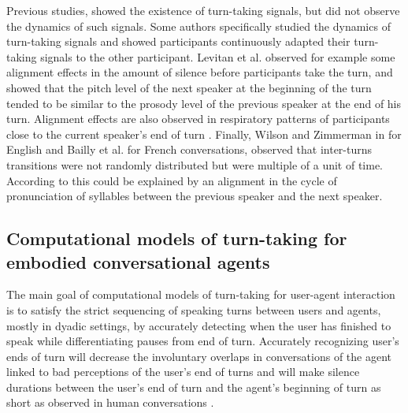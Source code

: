 Previous studies, showed the existence of turn-taking signals, but did not observe the dynamics of such signals.
Some authors specifically studied the dynamics of turn-taking signals and showed  participants continuously adapted their turn-taking signals to the other participant.
 Levitan et al. \citep{levitan_entrainment_2015} observed for example some
alignment effects in the amount of silence before participants
take the turn, and showed that the pitch level of
the next speaker at the beginning of the turn tended to
be similar to the prosody level of the previous speaker
at the end of his turn. 
Alignment effects are also observed in respiratory patterns of participants close to the current speaker's end of turn \citep{mcfarland_respiratory_2001}.
Finally, Wilson and Zimmerman\citep{wilson_structure_1986} in for English and Bailly et al. \citep{bailly_pauses_2012} for French conversations, observed that inter-turns transitions were not randomly distributed but were multiple of a unit of time. According to \citep{wilson_oscillator_2005} this could be explained by an alignment in the cycle of pronunciation of syllables between
the previous speaker and the next speaker.


\subsection{Computational models of turn-taking for embodied conversational agents}
\label{comp_modelling}


The main goal of computational models of turn-taking for user-agent interaction is to satisfy the strict sequencing of speaking turns between users and agents, mostly in
dyadic settings, by accurately detecting when the user has finished to speak while differentiating pauses from end of turn. Accurately recognizing user's ends of turn
will decrease the involuntary overlaps in conversations of the agent linked to bad perceptions of the user's end of turns and will make silence durations between the user's end of turn and the agent's beginning of turn as short as observed
in human conversations \citep{balentine_debouncing_1997,ward_root_2005,raux_optimizing_2012,
jonsdottir_distributed_2013}.

